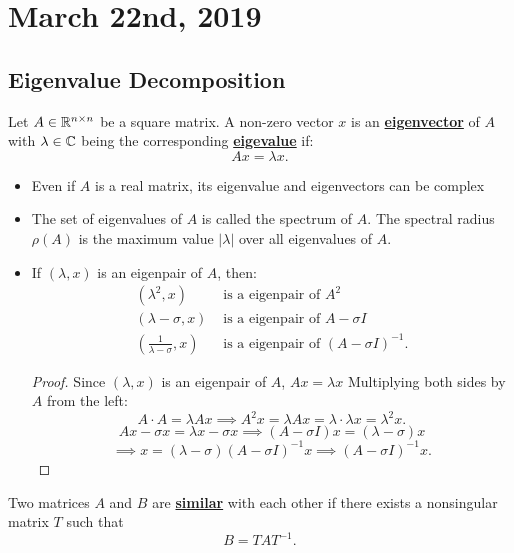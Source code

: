 \documentclass[../main/main.tex]{subfiles}
\begin{document}
\section{March 22nd, 2019}
\subsection{Eigenvalue Decomposition}

		Let $A \in \mathbb{R}^{n\times n}$ be a square matrix. A non-zero vector $x$ is an \underline{\textbf{eigenvector}} of $A$ with  $\lambda\in \mathbb{C}$ being the corresponding \underline{\textbf{eigevalue}} if: \[
		Ax=\lambda x		.\]  	

\begin{itemize}
		\itemsep0.3cm
				\item Even if $A$ is a real matrix, its eigenvalue and eigenvectors can be complex
				\item The set of eigenvalues of $A$ is called the spectrum of $A$. The spectral radius $\rho\left( A \right) $ is the maximum value $\left| \lambda \right| $ over all eigenvalues of $A$.
				\item If $\left(\lambda,x \right) $ is an eigenpair of $A$, then:
						\begin{align*}
								\left( \lambda^2,x \right) &\textrm{ is a eigenpair of }A^2\\
								\left( \lambda-\sigma,x \right) &\textrm{ is a eigenpair of }A-\sigma I\\
								\left( \frac{1}{\lambda-\sigma},x \right) &\textrm{ is a eigenpair of }\left( A-\sigma I \right) ^{-1}
						.\end{align*}
\begin{proof}
							Since $\left( \lambda,x \right) $ is an eigenpair of $A$, $Ax=\lambda x$ Multiplying both sides by $A$ from the left:\[
				A\cdot A=\lambda A x \implies A^2x=\lambda Ax=\lambda\cdot\lambda x=\lambda^2 x
				.\] 
				\[
						Ax-\sigma x=\lambda x-\sigma x \implies \left( A-\sigma I \right) x=\left( \lambda-\sigma\right)x\]\[\implies x=\left( \lambda-\sigma \right) \left( A-\sigma I \right) ^{-1}x\implies\left( A-\sigma I \right) ^{-1}x
				.\]		
\end{proof}
\end{itemize}
\begin{definition}
	Two matrices $A$ and $B$ are \underline{\textbf{similar}} with each other if there exists a nonsingular matrix $T$ such that \[
		B=TAT^{-1}
		.\]  
\end{definition}
\end{document}
